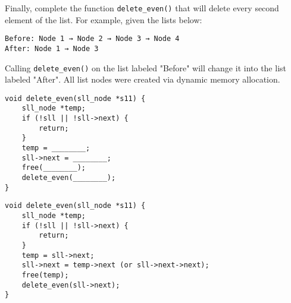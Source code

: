 \begin{blocksection}
\question
Finally, complete the function \lstinline$delete_even()$ that will delete every second element of the list. For example, given the lists below:

\begin{verbatim}
Before: Node 1 → Node 2 → Node 3 → Node 4 
After: Node 1 → Node 3
\end{verbatim}

Calling \lstinline$delete_even()$ on the list labeled "Before" will change it into the list labeled "After". All list nodes were created via dynamic memory allocation.

\begin{verbatim}
void delete_even(sll_node *s11) {
    sll_node *temp; 
    if (!sll || !sll->next) {
        return;
    }
    temp = ________; 
    sll->next = ________;
    free(________); 
    delete_even(________);
}
\end{verbatim}

\begin{solution}
\begin{verbatim}
void delete_even(sll_node *s11) {
    sll_node *temp; 
    if (!sll || !sll->next) {
        return;
    }
    temp = sll->next; 
    sll->next = temp->next (or sll->next->next);
    free(temp); 
    delete_even(sll->next);
}
\end{verbatim}
\end{solution}

\end{blocksection}
